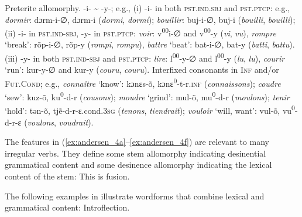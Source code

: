 \documentclass[output=paper, colorlinks,citecolor=brown]{langsci/langscibook}
\begin{document}
\ex \label{ex:andersen_4e}
      Preterite allomorphy. -i- {\textasciitilde} -y-; e.g., (i) -i- in both \textsc{pst.ind.sbj} and \textsc{pst.ptcp}: e.g., \textit{dormir}: dɔrm-i-∅, dɔrm-i (\textit{dormi}, \textit{dormi}); \textit{bouillir}: buj-i-∅, buj-i (\textit{bouilli}, \textit{bouilli}); (ii) -i- in \textsc{pst.ind-sbj}, -y- in \textsc{pst.ptcp}: \textit{voir}: v\textsuperscript{00}i-∅ and v\textsuperscript{00}{}-y (\textit{vi}, \textit{vu}), \textit{rompre} ‘break': rõp-i-∅, rõp-y (\textit{rompi}, \textit{rompu}), \textit{battre} ‘beat': bat-i-∅, bat-y (\textit{batti}, \textit{battu}). (iii) -y- in both \textsc{pst.ind-sbj} and \textsc{pst.ptcp}: \textit{lire}: l\textsuperscript{00}{}-y-∅ and l\textsuperscript{00}{}-y (\textit{lu}, \textit{lu}), \textit{courir} ‘run': kur-y-∅ and kur-y (\textit{couru}, \textit{couru}).
\ex \label{ex:andersen_4f}
      Interfixed consonants in \textsc{Inf} and/or \textsc{Fut.Cond}; e.g., \textit{connaître} ‘know': kɔnɛs-õ, kɔnɛ\textsuperscript{0}{}-t-r.\textsc{inf} (\textit{connaissons}); \textit{coudre} ‘sew': kuz-õ, ku\textsuperscript{0}{}-d-r (\textit{cousons}); \textit{moudre} ‘grind': mul-õ, mu\textsuperscript{0}{}-d-r (\textit{moulons}); \textit{tenir} ‘hold': tǝn-õ, tjẽ-d-r-ɛ.cond.\textsc{3sg} (\textit{tenons}, \textit{tiendrait}); \textit{vouloir} ‘will, want': vul-õ, vu\textsuperscript{0}{}-d-r-ɛ (\textit{voulons}, \textit{voudrait}).
    \z
\z\pagebreak

The features in (\ref{ex:andersen_4a}--\ref{ex:andersen_4f}) are relevant to many irregular verbs. They define some stem allomorphy indicating desinential grammatical content and some desinence allomorphy indicating the lexical content of the stem: This is fusion.

The following examples in  illustrate wordforms that combine lexical and grammatical content: Introflection.
\end{document}
